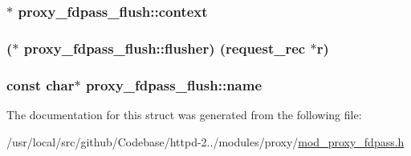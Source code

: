 \subsubsection[{\texorpdfstring{context}{context}}]{$\ast$ proxy\+\_\+fdpass\+\_\+flush\+::context}\hypertarget{structproxy__fdpass__flush_affd6f88674b0fbafb48060e6e0d81370}{}\label{structproxy__fdpass__flush_affd6f88674b0fbafb48060e6e0d81370}
\subsubsection[{\texorpdfstring{flusher}{flusher}}]{($\ast$ proxy\+\_\+fdpass\+\_\+flush\+::flusher) ({\bf request\+\_\+rec} $\ast${\bf r})}\hypertarget{structproxy__fdpass__flush_a2d8d526b17ab8fd21ccee8f6bcdd26ad}{}\label{structproxy__fdpass__flush_a2d8d526b17ab8fd21ccee8f6bcdd26ad}
\subsubsection[{\texorpdfstring{name}{name}}]{\setlength{\rightskip}{0pt plus 5cm}const char$\ast$ proxy\+\_\+fdpass\+\_\+flush\+::name}\hypertarget{structproxy__fdpass__flush_ac539ddc1366817d1b5227c6e36d4598a}{}\label{structproxy__fdpass__flush_ac539ddc1366817d1b5227c6e36d4598a}


The documentation for this struct was generated from the following file\+:\begin{DoxyCompactItemize}
\item 
/usr/local/src/github/\+Codebase/httpd-\/2../modules/proxy/\hyperlink{mod__proxy__fdpass_8h}{mod\+\_\+proxy\+\_\+fdpass.\+h}\end{DoxyCompactItemize}
